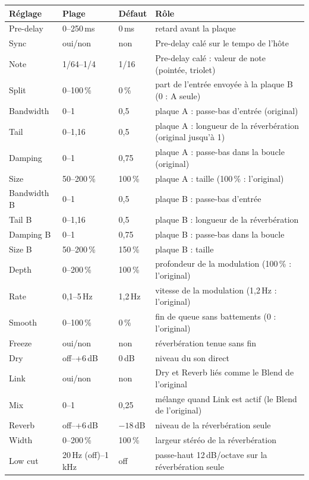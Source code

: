 \documentclass[a4paper,11pt]{article}
\newcommand{\dB}{\,dB}
\begin{document}
\begin{center}
\small
\begin{tabularx}{\textwidth}{@{}l l l X@{}}
\toprule
Réglage & Plage & Défaut & Rôle \\
\midrule
Pre-delay & 0--250\,ms & 0\,ms & retard avant la plaque \\
Sync & oui/non & non & Pre-delay calé sur le tempo de l'hôte \\
Note & 1/64--1/4 & 1/16 & Pre-delay calé : valeur de note (pointée, triolet) \\
Split & 0--100\,\% & 0\,\% & part de l'entrée envoyée à la plaque B (0 : A seule) \\
Bandwidth & 0--1 & 0,5 & plaque A : passe-bas d'entrée (original) \\
Tail & 0--1,16 & 0,5 & plaque A : longueur de la réverbération (original jusqu'à 1) \\
Damping & 0--1 & 0,75 & plaque A : passe-bas dans la boucle (original) \\
Size & 50--200\,\% & 100\,\% & plaque A : taille (100\,\% : l'original) \\
Bandwidth B & 0--1 & 0,5 & plaque B : passe-bas d'entrée \\
Tail B & 0--1,16 & 0,5 & plaque B : longueur de la réverbération \\
Damping B & 0--1 & 0,75 & plaque B : passe-bas dans la boucle \\
Size B & 50--200\,\% & 150\,\% & plaque B : taille \\
Depth & 0--200\,\% & 100\,\% & profondeur de la modulation (100\,\% : l'original) \\
Rate & 0,1--5\,Hz & 1,2\,Hz & vitesse de la modulation (1,2\,Hz : l'original) \\
Smooth & 0--100\,\% & 0\,\% & fin de queue sans battements (0 : l'original) \\
Freeze & oui/non & non & réverbération tenue sans fin \\
Dry & off--+6\dB & 0\dB & niveau du son direct \\
Link & oui/non & non & Dry et Reverb liés comme le Blend de l'original \\
Mix & 0--1 & 0,25 & mélange quand Link est actif (le Blend de l'original) \\
Reverb & off--+6\dB & $-18$\dB & niveau de la réverbération seule \\
Width & 0--200\,\% & 100\,\% & largeur stéréo de la réverbération \\
Low cut & 20\,Hz (off)--1\,kHz & off & passe-haut 12\dB/octave sur la réverbération seule \\

\end{tabularx}
\end{center}
\end{document}
